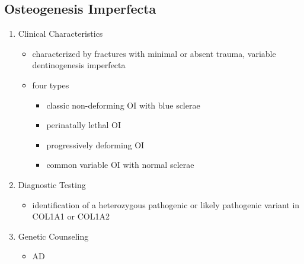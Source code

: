 \documentclass[12pt]{scrartcl}
\begin{document}
\subsection{Osteogenesis Imperfecta}
\label{sec:org4767c62}
\begin{enumerate}
\item Clinical Characteristics
\label{sec:org67cfa0e}
\begin{itemize}
\item characterized by fractures with minimal or absent trauma, variable
dentinogenesis imperfecta
\item four types
\begin{itemize}
\item classic non-deforming OI with blue sclerae
\item perinatally lethal OI
\item progressively deforming OI
\item common variable OI with normal sclerae
\end{itemize}
\end{itemize}

\item Diagnostic Testing
\label{sec:org789cece}
\begin{itemize}
\item identification of a heterozygous pathogenic or likely pathogenic
variant in COL1A1 or COL1A2
\end{itemize}
\item Genetic Counseling
\label{sec:org6088ed8}
\begin{itemize}
\item AD
\end{itemize}
\end{enumerate}
\end{document}
